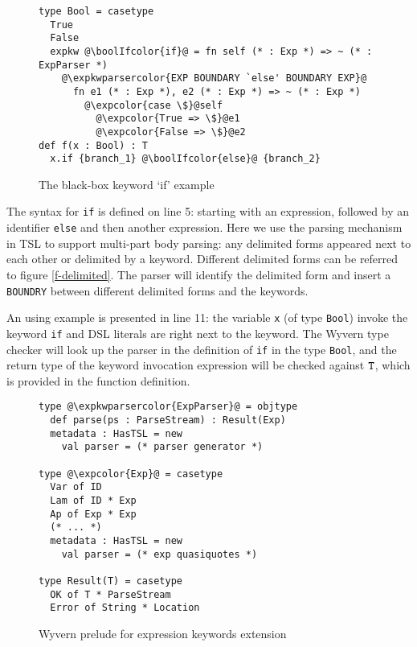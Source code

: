 \documentclass{sig-alternate}
\newcommand{\expkwparsercolor}[1]{\textcolor[HTML]{336699}{#1}}
\newcommand{\expcolor}[1]{\textcolor[HTML]{FF0033}{#1}}
\newcommand{\boolIfcolor}[1]{\textcolor[HTML]{5E0C0C}{#1}}
\newcommand{\mycaption}[1]{\vspace{-4px}\caption{#1}\vspace{-2px}}
\begin{document}
\begin{figure}[ht]
\begin{lstlisting}[style=wyvern]
type Bool = casetype 
  True
  False
  expkw @\boolIfcolor{if}@ = fn self (* : Exp *) => ~ (* : ExpParser *)
    @\expkwparsercolor{EXP BOUNDARY `else' BOUNDARY EXP}@
      fn e1 (* : Exp *), e2 (* : Exp *) => ~ (* : Exp *)
        @\expcolor{case \$}@self
          @\expcolor{True => \$}@e1
          @\expcolor{False => \$}@e2
def f(x : Bool) : T
  x.if {branch_1} @\boolIfcolor{else}@ {branch_2}
\end{lstlisting}
\mycaption{The black-box keyword `if' example\todo{color quotations}}
\label{if-example}
\end{figure}

The syntax for \verb|if| is defined on line 5: starting with an expression, followed by an identifier \verb|else| and then another expression. Here we use the parsing mechanism in TSL to support multi-part body parsing: any delimited forms appeared next to each other or delimited by a keyword. Different delimited forms can be referred to figure \ref{f-delimited}. The parser will identify the delimited form and insert a \verb|BOUNDRY| between different delimited forms and the keywords. 

An using example is presented in line 11: the variable \verb|x| (of type \verb|Bool|) invoke the keyword \verb|if| and DSL literals are right next to the keyword. The Wyvern type checker will look up the parser in the definition of \verb|if| in the type \verb|Bool|, and the return type of the keyword invocation expression will be checked against $\verb|T|$, which is provided in the function definition.  

\begin{figure}[ht!]
\begin{lstlisting}[style=wyvern]
type @\expkwparsercolor{ExpParser}@ = objtype
  def parse(ps : ParseStream) : Result(Exp)
  metadata : HasTSL = new 
    val parser = (* parser generator *)

type @\expcolor{Exp}@ = casetype
  Var of ID
  Lam of ID * Exp
  Ap of Exp * Exp
  (* ... *)
  metadata : HasTSL = new
    val parser = (* exp quasiquotes *)

type Result(T) = casetype
  OK of T * ParseStream
  Error of String * Location
\end{lstlisting}
\mycaption{Wyvern prelude for expression keywords extension}
\label{exp-prelude}
\end{figure}
\end{document}
